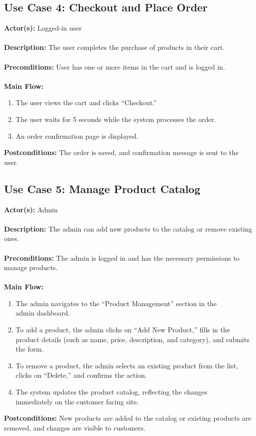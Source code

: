 \documentclass[a4paper,12pt]{article}
\begin{document}
	\subsection*{Use Case 4: Checkout and Place Order}
	\textbf{Actor(s):} Logged-in user \\ \\
	\textbf{Description:} The user completes the purchase of products in their cart. \\ \\
	\textbf{Preconditions:} User has one or more items in the cart and is logged in. \\ \\
	\textbf{Main Flow:}
	\begin{enumerate}
  		\item The user views the cart and clicks ``Checkout.''
  		\item The user waits for 5 seconds while the system processes the order.
  		\item An order confirmation page is displayed.
	\end{enumerate}
	\textbf{Postconditions:} The order is saved, and confirmation message is sent to the user.

	\subsection*{Use Case 5: Manage Product Catalog}
	\textbf{Actor(s):} Admin \\ \\
	\textbf{Description:} The admin can add new products to the catalog or remove existing ones. \\ \\			\textbf{Preconditions:} The admin is logged in and has the necessary permissions to manage products.
	\\ \\
	\textbf{Main Flow:}
	\begin{enumerate}
  	\item The admin navigates to the ``Product Management'' section in the \\ admin dashboard.
  	\item To add a product, the admin clicks on ``Add New Product,'' fills in the product details (such
  	as name, price, description, and category), and submits the form.
  	\item To remove a product, the admin selects an existing product from the list, clicks on
  	``Delete,'' and confirms the action.
  	\item The system updates the product catalog, reflecting the changes \\ immediately on the customer
  	facing site.
	\end{enumerate}
	\textbf{Postconditions:} New products are added to the catalog or existing products are removed, and
	changes are visible to customers.
\end{document}
